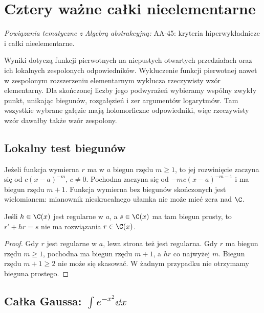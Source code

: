 \chapter{Cztery ważne całki nieelementarne}

\providecommand{\atlasref}[2]{#2}
\noindent\emph{Powiązania tematyczne z Algebrą abstrakcyjną:} \atlasref{AA-45::aa:ch:nonelementary-integrals}{AA-45: kryteria hiperwykładnicze i całki nieelementarne}.


Wyniki dotyczą funkcji pierwotnych na niepustych otwartych przedziałach oraz ich lokalnych zespolonych odpowiedników. Wykluczenie funkcji pierwotnej nawet w zespolonym rozszerzeniu elementarnym wyklucza rzeczywisty wzór elementarny. Dla skończonej liczby jego podwyrażeń wybieramy wspólny zwykły punkt, unikając biegunów, rozgałęzień i zer argumentów logarytmów. Tam wszystkie wybrane gałęzie mają holomorficzne odpowiedniki, więc rzeczywisty wzór dawałby także wzór zespolony.

\section{Lokalny test biegunów}

Jeżeli funkcja wymierna $r$ ma w $a$ biegun rzędu $m\ge1$, to jej rozwinięcie zaczyna się od $c(x-a)^{-m}$, $c\ne0$. Pochodna zaczyna się od $-mc(x-a)^{-m-1}$ i ma biegun rzędu $m+1$. Funkcja wymierna bez biegunów skończonych jest wielomianem: mianownik nieskracalnego ułamka nie może mieć zera nad $\C$.

\begin{lemat}
Jeśli $h\in\C(x)$ jest regularne w $a$, a $s\in\C(x)$ ma tam biegun prosty, to $r'+hr=s$ nie ma rozwiązania $r\in\C(x)$.
\end{lemat}
\begin{proof}
Gdy $r$ jest regularne w $a$, lewa strona też jest regularna. Gdy $r$ ma biegun rzędu $m\ge1$, pochodna ma biegun rzędu $m+1$, a $hr$ co najwyżej $m$. Biegun rzędu $m+1\ge2$ nie może się skasować. W żadnym przypadku nie otrzymamy bieguna prostego.
\end{proof}

\section{Całka Gaussa: $\int e^{-x^2}\dd x$}

